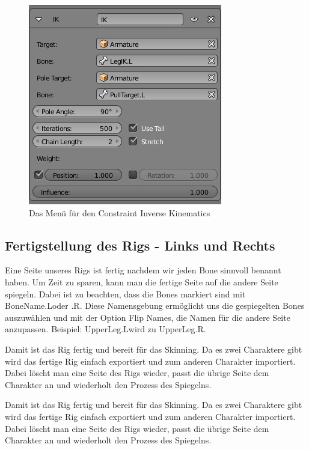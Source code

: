 \begin{figure}[H]
    \centering

    \includegraphics[width=.8\textwidth]{images/rigging_inverse_kinematics.png}
    \caption{Das Menü für den Constraint Inverse Kinematics}
\end{figure}

\subsection{Fertigstellung des Rigs - Links und Rechts}
Eine Seite unseres Rigs ist fertig nachdem wir jeden Bone sinnvoll benannt haben. Um Zeit zu sparen, kann man die fertige Seite auf die andere Seite spiegeln.
Dabei ist zu beachten, dass die Bones markiert sind mit \dq BoneName.L\dq oder \dq .R\dq. Diese Namensgebung ermöglicht uns die
gespiegelten Bones auszuwählen und mit der Option \dq Flip Names\dq, die Namen für die andere Seite anzupassen. Beispiel: \dq UpperLeg.L\dq wird zu \dq UpperLeg.R\dq.

Damit ist das Rig fertig und bereit für das Skinning. Da es zwei Charaktere gibt wird das fertige Rig einfach exportiert und zum anderen Charakter importiert.
Dabei löscht man eine Seite des Rigs wieder, passt die übrige Seite dem Charakter an und wiederholt den Prozess des Spiegelns.

Damit ist das Rig fertig und bereit für das Skinning. Da es zwei Charaktere gibt wird das fertige Rig einfach exportiert und zum anderen Charakter importiert.
Dabei löscht man eine Seite des Rigs wieder, passt die übrige Seite dem Charakter an und wiederholt den Prozess des Spiegelns.

